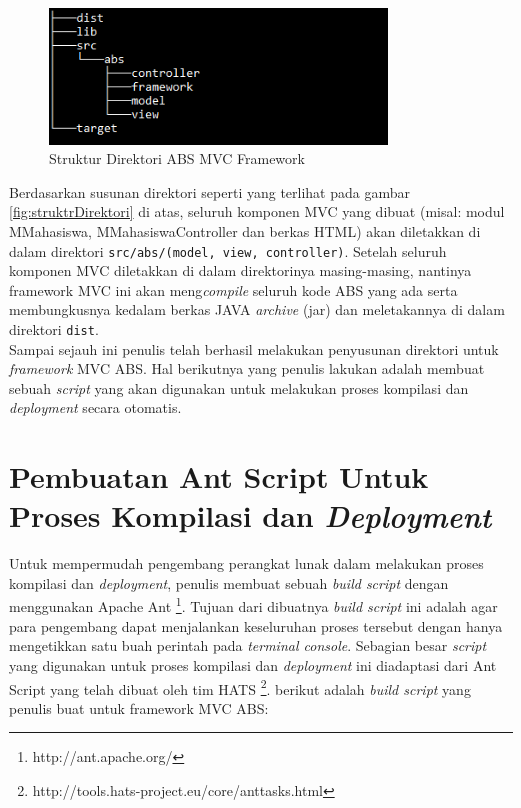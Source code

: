 \begin{figure}
    \centering
    \includegraphics[width=0.8\textwidth]
        {img/struktur-direktori.png}
    \caption{Struktur Direktori ABS MVC Framework}
    \label{fig:strukturDirektori}
\end{figure}

Berdasarkan susunan direktori seperti yang terlihat pada gambar \ref{fig:struktrDirektori} di atas, seluruh komponen MVC yang dibuat (misal: modul MMahasiswa, MMahasiswaController dan berkas HTML) akan diletakkan di dalam direktori \texttt{src/abs/(model, view, controller)}. Setelah seluruh komponen MVC diletakkan di dalam direktorinya masing-masing, nantinya framework MVC ini akan meng\textit{compile} seluruh kode ABS yang ada serta membungkusnya kedalam berkas JAVA \textit{archive} (jar) dan meletakannya di dalam direktori \texttt{dist}.\\

Sampai sejauh ini penulis telah berhasil melakukan penyusunan direktori untuk \textit{framework} MVC ABS. Hal berikutnya yang penulis lakukan adalah membuat sebuah \textit{script} yang akan digunakan untuk melakukan proses kompilasi dan \textit{deployment} secara otomatis.

\section{Pembuatan Ant Script Untuk Proses Kompilasi dan \textit{Deployment}}

Untuk mempermudah pengembang perangkat lunak dalam melakukan proses kompilasi dan \textit{deployment}, penulis membuat sebuah \textit{build script} dengan menggunakan Apache Ant \footnote{http://ant.apache.org/}. Tujuan dari dibuatnya \textit{build script} ini adalah agar para pengembang dapat menjalankan keseluruhan proses tersebut dengan hanya mengetikkan satu buah perintah pada \textit{terminal console}. Sebagian besar \textit{script} yang digunakan untuk proses kompilasi dan \textit{deployment} ini diadaptasi dari Ant Script yang telah dibuat oleh tim HATS \footnote{http://tools.hats-project.eu/core/anttasks.html}. berikut adalah \textit{build script} yang penulis buat untuk framework MVC ABS:

